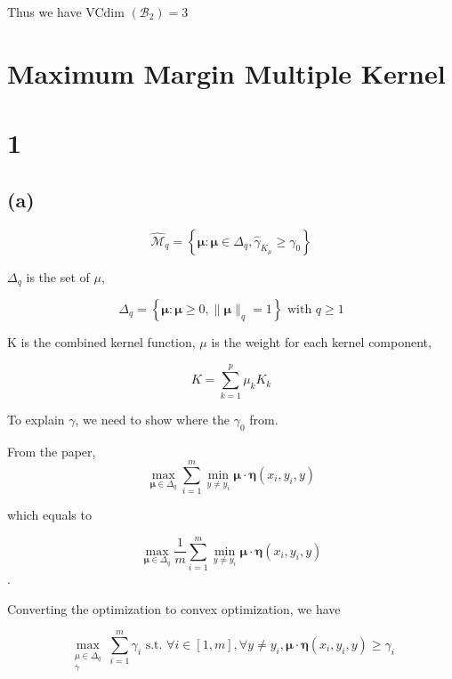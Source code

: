 \documentclass{article}
\begin{document}
Thus we have VCdim $\left(\mathcal{B}_{2}\right) = 3$

\section*{Maximum Margin Multiple Kernel}
\section*{1}
\subsection*{(a)}

\begin{equation}
    \widehat{\mathcal{M}}_{q}=\left\{\boldsymbol{\mu}: \boldsymbol{\mu} \in \Delta_{q}, \widehat{\gamma}_{K_{\mu}} \geq \gamma_{0}\right\}
\end{equation}

$\Delta_q$ is the set of $\mu$,

\begin{equation}
    \Delta_{q}=\left\{\boldsymbol{\mu}: \boldsymbol{\mu} \geq 0,\|\boldsymbol{\mu}\|_{q}=1\right\} \text { with } q \geq 1
\end{equation}

K is the combined kernel function, $\mu$ is the weight for each kernel component,

\begin{equation}
    K = \sum_{k=1}^{p} \mu_{k} K_{k}
\end{equation}

To explain $\gamma$, we need to show where the $\gamma_0$ from.

From the paper,
\begin{equation}
    \max _{\boldsymbol{\mu} \in \Delta_{q}} \sum_{i=1}^{m} \min _{y \neq y_{i}} \boldsymbol{\mu} \cdot \boldsymbol{\eta}\left(x_{i}, y_{i}, y\right)
\end{equation}

which equals to

\begin{equation}
    \max _{\boldsymbol{\mu} \in \Delta_{q}} \frac{1}{m} \sum_{i=1}^{m} \min _{y \neq y_{i}} \boldsymbol{\mu} \cdot \boldsymbol{\eta}\left(x_{i}, y_{i}, y\right)
\end{equation}.

Converting the optimization to convex optimization, we have

\begin{equation}
    \max _{\substack{\mu \in \Delta_{q} \\ \gamma}} \sum_{i=1}^{m} \gamma_{i} \text { s.t. } \forall i \in[1, m], \forall y \neq y_{i}, \boldsymbol{\mu} \cdot \boldsymbol{\eta}\left(x_{i}, y_{i}, y\right) \geq \gamma_{i}
    \label{eq:max_margin_convex}
\end{equation}
\end{document}
